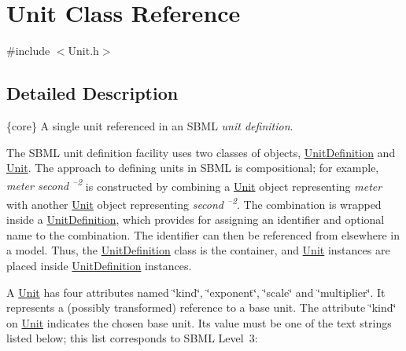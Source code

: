 \hypertarget{class_unit}{}\section{Unit Class Reference}
\label{class_unit}


{\ttfamily \#include $<$Unit.\+h$>$}



\subsection{Detailed Description}
\{core\} A single unit referenced in an S\+B\+ML {\itshape unit definition}.

The S\+B\+ML unit definition facility uses two classes of objects, \hyperlink{class_unit_definition}{Unit\+Definition} and \hyperlink{class_unit}{Unit}. The approach to defining units in S\+B\+ML is compositional; for example, {\itshape meter second\textsuperscript{ --2}} is constructed by combining a \hyperlink{class_unit}{Unit} object representing {\itshape meter} with another \hyperlink{class_unit}{Unit} object representing {\itshape second\textsuperscript{ --2}}. The combination is wrapped inside a \hyperlink{class_unit_definition}{Unit\+Definition}, which provides for assigning an identifier and optional name to the combination. The identifier can then be referenced from elsewhere in a model. Thus, the \hyperlink{class_unit_definition}{Unit\+Definition} class is the container, and \hyperlink{class_unit}{Unit} instances are placed inside \hyperlink{class_unit_definition}{Unit\+Definition} instances.

A \hyperlink{class_unit}{Unit} has four attributes named \char`\"{}kind\char`\"{}, \char`\"{}exponent\char`\"{}, \char`\"{}scale\char`\"{} and \char`\"{}multiplier\char`\"{}. It represents a (possibly transformed) reference to a base unit. The attribute \char`\"{}kind\char`\"{} on \hyperlink{class_unit}{Unit} indicates the chosen base unit. Its value must be one of the text strings listed below; this list corresponds to S\+B\+ML Level~3\+:


